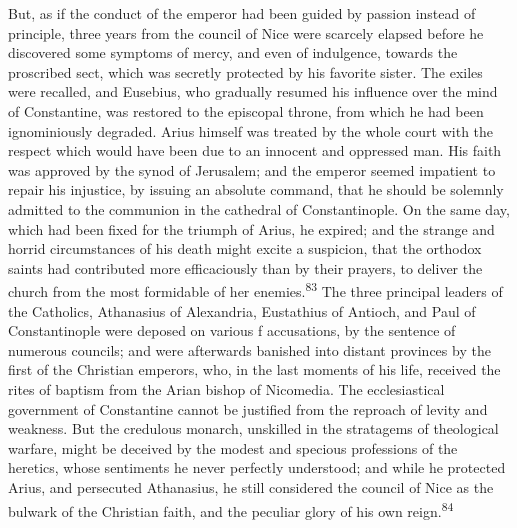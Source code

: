



But, as if the conduct of the emperor had been guided by passion
instead of principle, three years from the council of Nice were
scarcely elapsed before he discovered some symptoms of mercy, and
even of indulgence, towards the proscribed sect, which was
secretly protected by his favorite sister. The exiles were
recalled, and Eusebius, who gradually resumed his influence over
the mind of Constantine, was restored to the episcopal throne,
from which he had been ignominiously degraded. Arius himself was
treated by the whole court with the respect which would have been
due to an innocent and oppressed man. His faith was approved by
the synod of Jerusalem; and the emperor seemed impatient to
repair his injustice, by issuing an absolute command, that he
should be solemnly admitted to the communion in the cathedral of
Constantinople. On the same day, which had been fixed for the
triumph of Arius, he expired; and the strange and horrid
circumstances of his death might excite a suspicion, that the
orthodox saints had contributed more efficaciously than by their
prayers, to deliver the church from the most formidable of her
enemies.\textsuperscript{83} The three principal leaders of the Catholics,
Athanasius of Alexandria, Eustathius of Antioch, and Paul of
Constantinople were deposed on various f accusations, by the
sentence of numerous councils; and were afterwards banished into
distant provinces by the first of the Christian emperors, who, in
the last moments of his life, received the rites of baptism from
the Arian bishop of Nicomedia. The ecclesiastical government of
Constantine cannot be justified from the reproach of levity and
weakness. But the credulous monarch, unskilled in the stratagems
of theological warfare, might be deceived by the modest and
specious professions of the heretics, whose sentiments he never
perfectly understood; and while he protected Arius, and
persecuted Athanasius, he still considered the council of Nice as
the bulwark of the Christian faith, and the peculiar glory of his
own reign.\textsuperscript{84}

